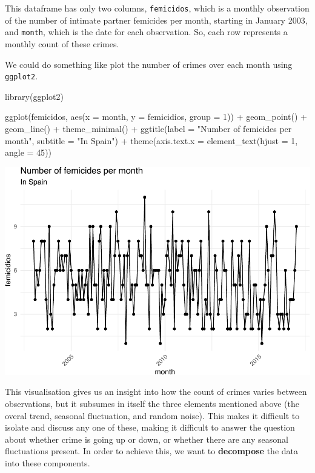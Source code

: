 \documentclass[
  krantz2]{krantz}
\makeatletter
\newenvironment{Shaded}{\begin{snugshade}}{\end{snugshade}}
\newcommand{\AttributeTok}[1]{\textcolor[rgb]{0.61,0.61,0.61}{#1}}
\newcommand{\DecValTok}[1]{\textcolor[rgb]{0.06,0.06,0.06}{#1}}
\newcommand{\FunctionTok}[1]{\textcolor[rgb]{0,0,0}{#1}}
\newcommand{\NormalTok}[1]{#1}
\newcommand{\SpecialCharTok}[1]{\textcolor[rgb]{0,0,0}{#1}}
\newcommand{\StringTok}[1]{\textcolor[rgb]{0.5,0.5,0.5}{#1}}
\newenvironment{kframe}{%
\medskip{}
\setlength{\fboxsep}{.8em}
 \def\at@end@of@kframe{}%
 \ifinner\ifhmode%
  \def\at@end@of@kframe{\end{minipage}}%
  \begin{minipage}{\columnwidth}%
 \fi\fi%
 \def\FrameCommand##1{\hskip\@totalleftmargin \hskip-\fboxsep
 \colorbox{shadecolor}{##1}\hskip-\fboxsep
     \hskip-\linewidth \hskip-\@totalleftmargin \hskip\columnwidth}%
 \MakeFramed {\advance\hsize-\width
   \@totalleftmargin\z@ \linewidth\hsize
   \@setminipage}}%
 {\par\unskip\endMakeFramed%
 \at@end@of@kframe}
\renewenvironment{Shaded}{\begin{kframe}}{\end{kframe}}
\makeatother
\begin{document}
This dataframe has only two columns, \texttt{femicidos}, which is a monthly observation of the number of intimate partner femicides per month, starting in January 2003, and \texttt{month}, which is the date for each observation. So, each row represents a monthly count of these crimes.

We could do something like plot the number of crimes over each month using \texttt{ggplot2}.

\begin{Shaded}
\begin{Highlighting}[]
\FunctionTok{library}\NormalTok{(ggplot2)}

\FunctionTok{ggplot}\NormalTok{(femicidos, }\FunctionTok{aes}\NormalTok{(}\AttributeTok{x =}\NormalTok{ month, }\AttributeTok{y =}\NormalTok{ femicidios, }\AttributeTok{group =} \DecValTok{1}\NormalTok{)) }\SpecialCharTok{+} 
  \FunctionTok{geom\_point}\NormalTok{() }\SpecialCharTok{+} 
  \FunctionTok{geom\_line}\NormalTok{() }\SpecialCharTok{+} 
  \FunctionTok{theme\_minimal}\NormalTok{() }\SpecialCharTok{+} 
  \FunctionTok{ggtitle}\NormalTok{(}\AttributeTok{label =} \StringTok{"Number of femicides per month"}\NormalTok{, }\AttributeTok{subtitle =} \StringTok{"In Spain"}\NormalTok{) }\SpecialCharTok{+} 
  \FunctionTok{theme}\NormalTok{(}\AttributeTok{axis.text.x =} \FunctionTok{element\_text}\NormalTok{(}\AttributeTok{hjust =} \DecValTok{1}\NormalTok{, }\AttributeTok{angle =} \DecValTok{45}\NormalTok{))}
\end{Highlighting}
\end{Shaded}

\includegraphics{crime_mapping_files/figure-latex/ggplottime-1.pdf}

This visualisation gives us an insight into how the count of crimes varies between observations, but it subsumes in itself the three elements mentioned above (the overal trend, seasonal fluctuation, and random noise). This makes it difficult to isolate and discuss any one of these, making it difficult to answer the question about whether crime is going up or down, or whether there are any seasonal fluctuations present. In order to achieve this, we want to \textbf{decompose} the data into these components.
\end{document}
